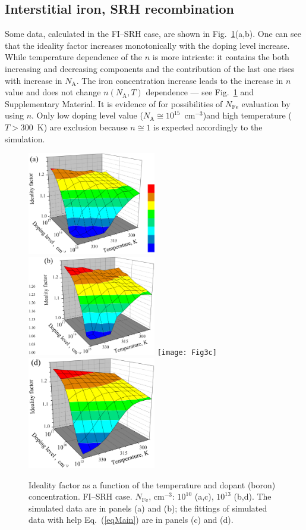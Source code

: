 \documentclass [sort&compress] {elsarticle}
\begin{document}
\subsection{Interstitial iron, SRH recombination}

Some data, calculated in the FI--SRH case, are shown in Fig.~\ref{figA}(a,b).
One can see that the ideality factor  increases monotonically with the doping level increase.
While temperature dependence of the  $n$  is more intricate: it contains the both increasing and decreasing components and the contribution of the last one rises with  increase in $N_\mathrm{A}$.
The iron concentration increase leads to  the increase in $n$ value and does not change $n(N_\mathrm{A},T)$ dependence --- see Fig.~\ref{figA} and Supplementary Material.
It is evidence of for possibilities of  $N_\mathrm{Fe}$ evaluation by using $n$.
Only low doping level value ($N_\mathrm{A}\cong10^{15}$~cm$^{-3}$)and high temperature ($T>300$~K) are exclusion
because $n\cong1$ is expected accordingly to the simulation.

\begin{figure}
\includegraphics[width=0.5\textwidth]{Fig3a}%
\includegraphics[width=0.5\textwidth]{Fig3b}
\texttt{[image: Fig3c]}
\includegraphics[width=0.5\textwidth]{Fig3d}
\caption{\label{figA}
Ideality factor as a function of the temperature and dopant (boron) concentration.
FI--SRH case.
$N_\mathrm{Fe}$, cm$^{-3}$: $10^{10}$ (a,c), $10^{13}$ (b,d).
The simulated data are in panels (a) and (b);
the fittings of simulated data with help Eq.~(\ref{eqMain})
are in panels (c) and (d).
}%
\end{figure}
\end{document}
